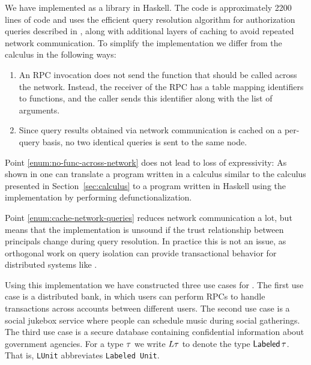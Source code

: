 We have implemented \lang{} as a library in Haskell. The code is approximately 2200 lines of code and uses the efficient query resolution algorithm for authorization queries described in \cite{Arden:2015:FA:2859845.2859998}, along with additional layers of caching to avoid repeated network communication. To simplify the implementation we differ from the calculus in the following ways:
\begin{enumerate}
    \item \label{enum:no-func-across-network} An RPC invocation does not send the function that should be called across the network. Instead, the receiver of the RPC has a table mapping identifiers to functions, and the caller sends this identifier along with the list of arguments.
    \item \label{enum:cache-network-queries} Since query results obtained via network communication is cached on a per-query basis, no two identical queries is sent to the same node.
\end{enumerate}

Point \ref{enum:no-func-across-network} does not lead to loss of expressivity: As shown in \cite{Cooper:2009:RC:1599410.1599439} one can translate a program written in a calculus similar to the calculus presented in Section~\ref{sec:calculus} to a program written in Haskell using the \lang{} implementation by performing defunctionalization.

Point \ref{enum:cache-network-queries} reduces network communication a lot, but means that the implementation is unsound if the trust relationship between principals change during query resolution. In practice this is not an issue, as orthogonal work on query isolation \cite{Liu:2009:FPS:1629575.1629606} can provide transactional behavior for distributed systems like \lang.

Using this implementation we have constructed three use cases for \lang. The first use case is a distributed bank, in which users can perform RPCs to handle transactions across accounts between different users. The second use case is a social jukebox service \cite{Sprague:2008:MSU:1385569.1385652} where people can schedule music during social gatherings. The third use case is a secure database containing confidential information about government agencies. For a type $\tau$ we write $L\tau$ to denote the type $\mathsf{Labeled}\,\tau$. That is, \lstinline|LUnit| abbreviates \lstinline|Labeled Unit|.

